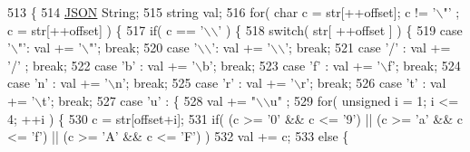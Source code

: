 \begin{DoxyCode}
513                                                            \{
514         \mbox{\hyperlink{class_j_s_o_n}{JSON}} String;
515         \textcolor{keywordtype}{string} val;
516         \textcolor{keywordflow}{for}( \textcolor{keywordtype}{char} c = str[++offset]; c != \textcolor{charliteral}{'\(\backslash\)"'} ; c = str[++offset] ) \{
517             \textcolor{keywordflow}{if}( c == \textcolor{charliteral}{'\(\backslash\)\(\backslash\)'} ) \{
518                 \textcolor{keywordflow}{switch}( str[ ++offset ] ) \{
519                 \textcolor{keywordflow}{case} \textcolor{charliteral}{'\(\backslash\)"'}: val += \textcolor{charliteral}{'\(\backslash\)"'}; \textcolor{keywordflow}{break};
520                 \textcolor{keywordflow}{case} \textcolor{charliteral}{'\(\backslash\)\(\backslash\)'}: val += \textcolor{charliteral}{'\(\backslash\)\(\backslash\)'}; \textcolor{keywordflow}{break};
521                 \textcolor{keywordflow}{case} \textcolor{charliteral}{'/'} : val += \textcolor{charliteral}{'/'} ; \textcolor{keywordflow}{break};
522                 \textcolor{keywordflow}{case} \textcolor{charliteral}{'b'} : val += \textcolor{charliteral}{'\(\backslash\)b'}; \textcolor{keywordflow}{break};
523                 \textcolor{keywordflow}{case} \textcolor{charliteral}{'f'} : val += \textcolor{charliteral}{'\(\backslash\)f'}; \textcolor{keywordflow}{break};
524                 \textcolor{keywordflow}{case} \textcolor{charliteral}{'n'} : val += \textcolor{charliteral}{'\(\backslash\)n'}; \textcolor{keywordflow}{break};
525                 \textcolor{keywordflow}{case} \textcolor{charliteral}{'r'} : val += \textcolor{charliteral}{'\(\backslash\)r'}; \textcolor{keywordflow}{break};
526                 \textcolor{keywordflow}{case} \textcolor{charliteral}{'t'} : val += \textcolor{charliteral}{'\(\backslash\)t'}; \textcolor{keywordflow}{break};
527                 \textcolor{keywordflow}{case} \textcolor{charliteral}{'u'} : \{
528                     val += \textcolor{stringliteral}{"\(\backslash\)\(\backslash\)u"} ;
529                     \textcolor{keywordflow}{for}( \textcolor{keywordtype}{unsigned} i = 1; i <= 4; ++i ) \{
530                         c = str[offset+i];
531                         \textcolor{keywordflow}{if}( (c >= \textcolor{charliteral}{'0'} && c <= \textcolor{charliteral}{'9'}) || (c >= \textcolor{charliteral}{'a'} && c <= \textcolor{charliteral}{'f'}) || (c >= \textcolor{charliteral}{'A'} && c <= \textcolor{charliteral}{'F'}) )
532                             val += c;
533                         \textcolor{keywordflow}{else} \{

\end{DoxyCode}
